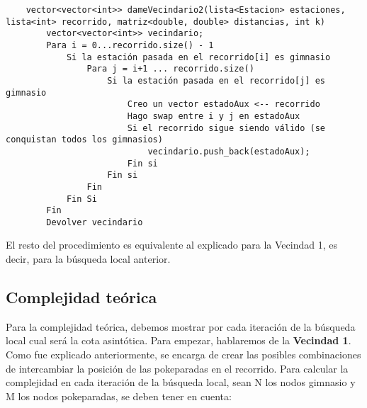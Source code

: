     \begin{codesnippet}
    \begin{verbatim}
    vector<vector<int>> dameVecindario2(lista<Estacion> estaciones, lista<int> recorrido, matriz<double, double> distancias, int k)
        vector<vector<int>> vecindario;
        Para i = 0...recorrido.size() - 1
            Si la estación pasada en el recorrido[i] es gimnasio
                Para j = i+1 ... recorrido.size()
                    Si la estación pasada en el recorrido[j] es gimnasio
                        Creo un vector estadoAux <-- recorrido
                        Hago swap entre i y j en estadoAux
                        Si el recorrido sigue siendo válido (se conquistan todos los gimnasios)
                            vecindario.push_back(estadoAux);
                        Fin si
                    Fin si
                Fin
            Fin Si
        Fin
        Devolver vecindario
    \end{verbatim}
    \end{codesnippet}
    
    \par El resto del procedimiento es equivalente al explicado para la Vecindad 1, es decir, para la búsqueda local anterior.
   
    \subsection{Complejidad teórica}
        Para la complejidad teórica, debemos mostrar por cada iteración de la búsqueda local cual será la cota asintótica. Para empezar, hablaremos de la \textbf{Vecindad 1}. Como fue explicado anteriormente, se encarga de crear las posibles combinaciones de intercambiar la posición de las pokeparadas en el recorrido. Para calcular la complejidad en cada iteración de la búsqueda local, sean N los nodos gimnasio y M los nodos pokeparadas, se deben tener en cuenta:

